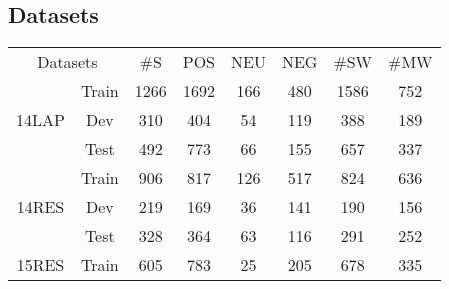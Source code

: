 \documentclass[11pt]{article}
\begin{document}
\subsection{Datasets}
\begin{table}[t]
	\scriptsize
	\centering
	\begin{tabular}{cc|cccccc}
		\hline
		\multicolumn{2}{c|}{\multirow{2}{*}{Datasets}}      & \multirow{2}{*}{\#S} & \multirow{2}{*}{POS} & \multirow{2}{*}{NEU} & \multirow{2}{*}{NEG} & \multirow{2}{*}{\#SW} & \multirow{2}{*}{\#MW} \\
		\multicolumn{2}{c|}{}                               &                           &                           &                          &                           &                              &                            \\ \hline
		\multicolumn{1}{c|}{\multirow{3}{*}{14LAP}} & Train & 1266                      & 1692                      & 166                      & 480                       & 1586                         & 752                        \\
		\multicolumn{1}{c|}{}                       & Dev   & 310                       & 404                       & 54                       & 119                       & 388                          & 189                        \\
		\multicolumn{1}{c|}{}                       & Test  & 492                       & 773                       & 66                       & 155                       & 657                          & 337                        \\ \hline
		\multicolumn{1}{c|}{\multirow{3}{*}{14RES}} & Train & 906                       & 817                       & 126                      & 517                       & 824                          & 636                        \\
		\multicolumn{1}{c|}{}                       & Dev   & 219                       & 169                       & 36                       & 141                       & 190                          & 156                        \\
		\multicolumn{1}{c|}{}                       & Test  & 328                       & 364                       & 63                       & 116                       & 291                          & 252                        \\ \hline
		\multicolumn{1}{c|}{\multirow{3}{*}{15RES}} & Train & 605                       & 783                       & 25                       & 205                       & 678                          & 335                        \\

\end{tabular}
\end{table}
\end{document}
